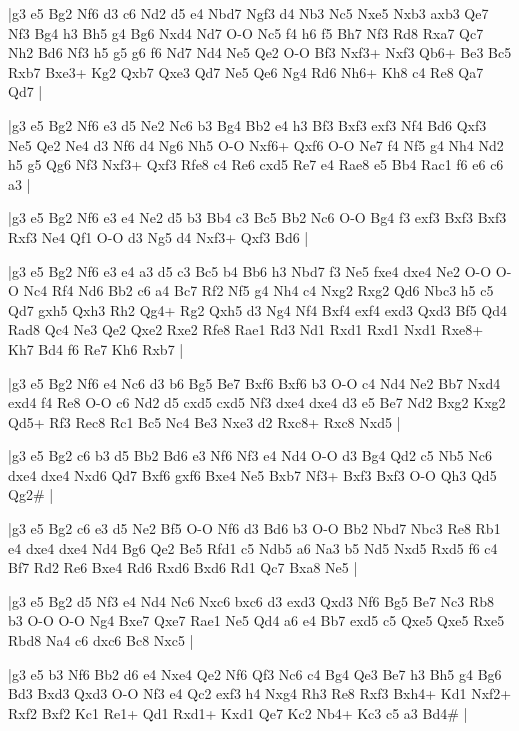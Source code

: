 \whitename{}
\blackname{}
\makegametitle
|g3 e5 Bg2 Nf6 d3 c6 Nd2 d5 e4 Nbd7 Ngf3 d4 Nb3 Nc5 Nxe5 Nxb3 axb3 Qe7 Nf3 Bg4 h3 Bh5 g4 Bg6 Nxd4 Nd7 O-O Nc5 f4 h6 f5 Bh7 Nf3 Rd8 Rxa7 Qc7 Nh2 Bd6 Nf3 h5 g5 g6 f6 Nd7 Nd4 Ne5 Qe2 O-O Bf3 Nxf3+ Nxf3 Qb6+ Be3 Bc5 Rxb7 Bxe3+ Kg2 Qxb7 Qxe3 Qd7 Ne5 Qe6 Ng4 Rd6 Nh6+ Kh8 c4 Re8 Qa7 Qd7  |

\whitename{}
\blackname{}
\makegametitle
|g3 e5 Bg2 Nf6 e3 d5 Ne2 Nc6 b3 Bg4 Bb2 e4 h3 Bf3 Bxf3 exf3 Nf4 Bd6 Qxf3 Ne5 Qe2 Ne4 d3 Nf6 d4 Ng6 Nh5 O-O Nxf6+ Qxf6 O-O Ne7 f4 Nf5 g4 Nh4 Nd2 h5 g5 Qg6 Nf3 Nxf3+ Qxf3 Rfe8 c4 Re6 cxd5 Re7 e4 Rae8 e5 Bb4 Rac1 f6 e6 c6 a3  |

\whitename{}
\blackname{}
\makegametitle
|g3 e5 Bg2 Nf6 e3 e4 Ne2 d5 b3 Bb4 c3 Bc5 Bb2 Nc6 O-O Bg4 f3 exf3 Bxf3 Bxf3 Rxf3 Ne4 Qf1 O-O d3 Ng5 d4 Nxf3+ Qxf3 Bd6  |

\whitename{}
\blackname{}
\makegametitle
|g3 e5 Bg2 Nf6 e3 e4 a3 d5 c3 Bc5 b4 Bb6 h3 Nbd7 f3 Ne5 fxe4 dxe4 Ne2 O-O O-O Nc4 Rf4 Nd6 Bb2 c6 a4 Bc7 Rf2 Nf5 g4 Nh4 c4 Nxg2 Rxg2 Qd6 Nbc3 h5 c5 Qd7 gxh5 Qxh3 Rh2 Qg4+ Rg2 Qxh5 d3 Ng4 Nf4 Bxf4 exf4 exd3 Qxd3 Bf5 Qd4 Rad8 Qc4 Ne3 Qe2 Qxe2 Rxe2 Rfe8 Rae1 Rd3 Nd1 Rxd1 Rxd1 Nxd1 Rxe8+ Kh7 Bd4 f6 Re7 Kh6 Rxb7  |

\whitename{}
\blackname{}
\makegametitle
|g3 e5 Bg2 Nf6 e4 Nc6 d3 b6 Bg5 Be7 Bxf6 Bxf6 b3 O-O c4 Nd4 Ne2 Bb7 Nxd4 exd4 f4 Re8 O-O c6 Nd2 d5 cxd5 cxd5 Nf3 dxe4 dxe4 d3 e5 Be7 Nd2 Bxg2 Kxg2 Qd5+ Rf3 Rec8 Rc1 Bc5 Nc4 Be3 Nxe3 d2 Rxc8+ Rxc8 Nxd5  |

\whitename{}
\blackname{}
\makegametitle
|g3 e5 Bg2 c6 b3 d5 Bb2 Bd6 e3 Nf6 Nf3 e4 Nd4 O-O d3 Bg4 Qd2 c5 Nb5 Nc6 dxe4 dxe4 Nxd6 Qd7 Bxf6 gxf6 Bxe4 Ne5 Bxb7 Nf3+ Bxf3 Bxf3 O-O Qh3 Qd5 Qg2\#  |

\whitename{}
\blackname{}
\makegametitle
|g3 e5 Bg2 c6 e3 d5 Ne2 Bf5 O-O Nf6 d3 Bd6 b3 O-O Bb2 Nbd7 Nbc3 Re8 Rb1 e4 dxe4 dxe4 Nd4 Bg6 Qe2 Be5 Rfd1 c5 Ndb5 a6 Na3 b5 Nd5 Nxd5 Rxd5 f6 c4 Bf7 Rd2 Re6 Bxe4 Rd6 Rxd6 Bxd6 Rd1 Qc7 Bxa8 Ne5  |

\whitename{}
\blackname{}
\makegametitle
|g3 e5 Bg2 d5 Nf3 e4 Nd4 Nc6 Nxc6 bxc6 d3 exd3 Qxd3 Nf6 Bg5 Be7 Nc3 Rb8 b3 O-O O-O Ng4 Bxe7 Qxe7 Rae1 Ne5 Qd4 a6 e4 Bb7 exd5 c5 Qxe5 Qxe5 Rxe5 Rbd8 Na4 c6 dxc6 Bc8 Nxc5  |

\whitename{}
\blackname{}
\makegametitle
|g3 e5 b3 Nf6 Bb2 d6 e4 Nxe4 Qe2 Nf6 Qf3 Nc6 c4 Bg4 Qe3 Be7 h3 Bh5 g4 Bg6 Bd3 Bxd3 Qxd3 O-O Nf3 e4 Qc2 exf3 h4 Nxg4 Rh3 Re8 Rxf3 Bxh4+ Kd1 Nxf2+ Rxf2 Bxf2 Kc1 Re1+ Qd1 Rxd1+ Kxd1 Qe7 Kc2 Nb4+ Kc3 c5 a3 Bd4\#  |

